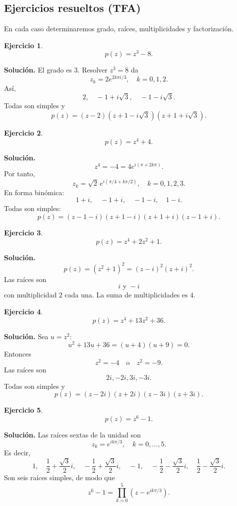 \documentclass[12pt]{article}
\newtheorem{ejercicio}{Ejercicio}[section]
\begin{document}
\subsection*{Ejercicios resueltos (TFA)}
En cada caso determinaremos grado, raíces, multiplicidades y factorización.

\begin{ejercicio}
\[
p(z)=z^3-8.
\]
\end{ejercicio}

\textbf{Solución.}
El grado es $3$. Resolver $z^3=8$ da
\[
z_k=2e^{2k\pi i/3},\quad k=0,1,2.
\]
Así,
\[
2,\quad -1+i\sqrt3,\quad -1-i\sqrt3.
\]
Todas son simples y
\[
\boxed{
p(z)=(z-2)(z+1-i\sqrt3)(z+1+i\sqrt3).
}
\]

\begin{ejercicio}
\[
p(z)=z^4+4.
\]
\end{ejercicio}

\textbf{Solución.}
\[
z^4=-4=4e^{i(\pi+2k\pi)}.
\]
Por tanto,
\[
z_k=\sqrt2\,e^{i(\pi/4+k\pi/2)},\quad k=0,1,2,3.
\]
En forma binómica:
\[
1+i,\quad -1+i,\quad -1-i,\quad 1-i.
\]
Todas son simples:
\[
\boxed{
p(z)=(z-1-i)(z+1-i)(z+1+i)(z-1+i).
}
\]

\begin{ejercicio}
\[
p(z)=z^4+2z^2+1.
\]
\end{ejercicio}

\textbf{Solución.}
\[
p(z)=(z^2+1)^2=(z-i)^2(z+i)^2.
\]
Las raíces son
\[
\boxed{i\text{ y }-i}
\]
con multiplicidad $2$ cada una. La suma de multiplicidades es $4$.

\begin{ejercicio}
\[
p(z)=z^4+13z^2+36.
\]
\end{ejercicio}

\textbf{Solución.}
Sea $u=z^2$:
\[
u^2+13u+36=(u+4)(u+9)=0.
\]
Entonces
\[
z^2=-4\quad\text{o}\quad z^2=-9.
\]
Las raíces son
\[
\boxed{2i,-2i,3i,-3i}.
\]
Todas son simples y
\[
\boxed{
p(z)=(z-2i)(z+2i)(z-3i)(z+3i).
}
\]

\begin{ejercicio}
\[
p(z)=z^6-1.
\]
\end{ejercicio}

\textbf{Solución.}
Las raíces sextas de la unidad son
\[
z_k=e^{ik\pi/3},\quad k=0,\ldots,5.
\]
Es decir,
\[
1,\quad
\frac12+\frac{\sqrt3}{2}i,\quad
-\frac12+\frac{\sqrt3}{2}i,\quad
-1,\quad
-\frac12-\frac{\sqrt3}{2}i,\quad
\frac12-\frac{\sqrt3}{2}i.
\]
Son seis raíces simples, de modo que
\[
\boxed{
z^6-1=\prod_{k=0}^{5}(z-e^{ik\pi/3}).
}
\]
\end{document}
